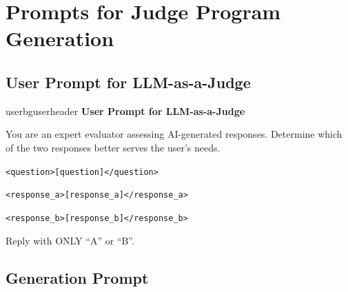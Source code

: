 \documentclass[11pt]{article}
\newcommand{\pgreen}[1]{{\color{promptgreen}\texttt{#1}}}
\begin{document}
\appendix
\section{Prompts for Judge Program Generation}

\subsection{User Prompt for LLM-as-a-Judge}\label{app:llm-judge}

\begin{promptbox}{userbg}{userheader}
\textbf{User Prompt for LLM-as-a-Judge}

\medskip
You are an expert evaluator assessing AI-generated responses. Determine which of the two responses better serves the user's needs.

\pgreen{<question>}\pgreen{[question]}\pgreen{</question>}

\pgreen{<response\_a>}\pgreen{[response\_a]}\pgreen{</response\_a>}

\pgreen{<response\_b>}\pgreen{[response\_b]}\pgreen{</response\_b>}

Reply with ONLY ``A'' or ``B''.
\end{promptbox}

\subsection{Generation Prompt}\label{app:gen-prompt}
\end{document}
